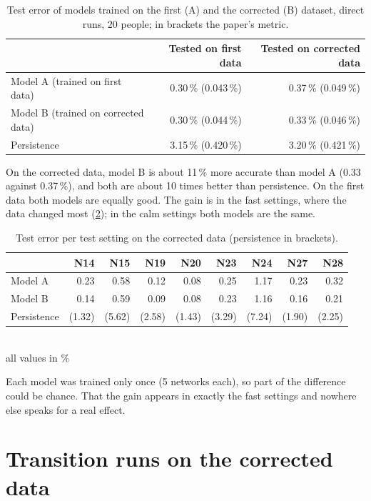 \begin{table}[h]
  \centering
  \caption{Test error of models trained on the first (A) and the corrected (B) dataset, direct runs, 20
  people; in brackets the paper's metric.}
  \label{tab:ab}
  \begin{tabular}{lrr}
    \toprule
     & Tested on first data & Tested on corrected data\\
    \midrule
    Model A (trained on first data) & 0.30\,\% (0.043\,\%) & 0.37\,\% (0.049\,\%)\\
    Model B (trained on corrected data) & 0.30\,\% (0.044\,\%) & 0.33\,\% (0.046\,\%)\\
    Persistence & 3.15\,\% (0.420\,\%) & 3.20\,\% (0.421\,\%)\\
    \bottomrule
  \end{tabular}
\end{table}

On the corrected data, model B is about 11\,\% more accurate than model A (0.33 against 0.37\,\%), and both are
about 10 times better than persistence. On the first data both models are equally good. The gain is in the fast
settings, where the data changed most (\cref{tab:ab_cases}); in the calm settings both models are the same.

\begin{table}[h]
  \centering
  \caption{Test error per test setting on the corrected data (persistence in brackets).}
  \label{tab:ab_cases}
  \begin{tabular}{lrrrrrrrr}
    \toprule
     & N14 & N15 & N19 & N20 & N23 & N24 & N27 & N28\\
    \midrule
    Model A & 0.23 & 0.58 & 0.12 & 0.08 & 0.25 & 1.17 & 0.23 & 0.32\\
    Model B & 0.14 & 0.59 & 0.09 & 0.08 & 0.23 & 1.16 & 0.16 & 0.21\\
    Persistence & (1.32) & (5.62) & (2.58) & (1.43) & (3.29) & (7.24) & (1.90) & (2.25)\\
    \bottomrule
  \end{tabular}
  \\[0.3em]{\small all values in \%}
\end{table}

Each model was trained only once (5 networks each), so part of the difference could be chance. That the gain
appears in exactly the fast settings and nowhere else speaks for a real effect. 

\section{Transition runs on the corrected data}
